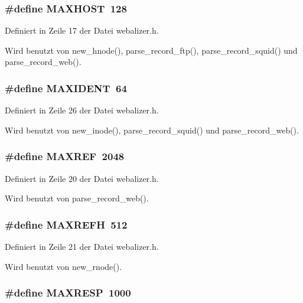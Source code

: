 \subsubsection{\setlength{\rightskip}{0pt plus 5cm}\#define MAXHOST~128}\label{webalizer_8h_35a96510c197e5b56b079fd4b85a40d6}




Definiert in Zeile 17 der Datei webalizer.h.

Wird benutzt von new\_\-hnode(), parse\_\-record\_\-ftp(), parse\_\-record\_\-squid() und parse\_\-record\_\-web().
\subsubsection{\setlength{\rightskip}{0pt plus 5cm}\#define MAXIDENT~64}\label{webalizer_8h_f4f5153d8faa075eda9141a6de77764b}




Definiert in Zeile 26 der Datei webalizer.h.

Wird benutzt von new\_\-inode(), parse\_\-record\_\-squid() und parse\_\-record\_\-web().
\subsubsection{\setlength{\rightskip}{0pt plus 5cm}\#define MAXREF~2048}\label{webalizer_8h_93490f19b31aee2379f0acc0aa08af06}




Definiert in Zeile 20 der Datei webalizer.h.

Wird benutzt von parse\_\-record\_\-web().
\subsubsection{\setlength{\rightskip}{0pt plus 5cm}\#define MAXREFH~512}\label{webalizer_8h_2c5b86478207547dbb0f2f026725c8f8}




Definiert in Zeile 21 der Datei webalizer.h.

Wird benutzt von new\_\-rnode().
\subsubsection{\setlength{\rightskip}{0pt plus 5cm}\#define MAXRESP~1000}\label{webalizer_8h_3d47d7a8b615ae32d0978491b0fdd2a7}




